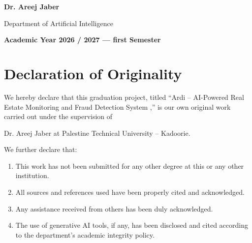 \documentclass[12pt,a4paper,oneside]{report}
\newcommand{\ProjectName}{Ardi}
\newcommand{\ProjectFullTitle}{
AI-Powered Real Estate Monitoring and Fraud Detection System
}
\newcommand{\SupervisorName}{
Dr. Areej Jaber
}
\begin{document}
\begin{titlepage}
\begin{center}
{\fontsize{13}{17}\selectfont
\textbf{\SupervisorName}
}

\vspace{0.10cm}

{\fontsize{12}{16}\selectfont
Department of Artificial Intelligence
}

\vfill


{\fontsize{12}{16}\selectfont
\textbf{
Academic Year 2026 / 2027 --- first Semester
}
}

\end{center}

\end{titlepage}




\chapter*{Declaration of Originality}


We hereby declare that this graduation project, titled
``\ProjectName{} -- \ProjectFullTitle,''
is our own original work carried out under the supervision of
\SupervisorName{} at Palestine Technical University -- Kadoorie.

We further declare that:

\begin{enumerate}

    \item This work has not been submitted for any other degree
    at this or any other institution.

    \item All sources and references used have been properly
    cited and acknowledged.

    \item Any assistance received from others has been duly
    acknowledged.

    \item The use of generative AI tools, if any, has been
    disclosed and cited according to the department's
    academic integrity policy.

\end{enumerate}
\end{document}
